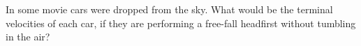 
In some movie cars were dropped from the sky.
What would be the terminal velocities of each car, if they are
performing a free-fall headfirst without tumbling in the air?
